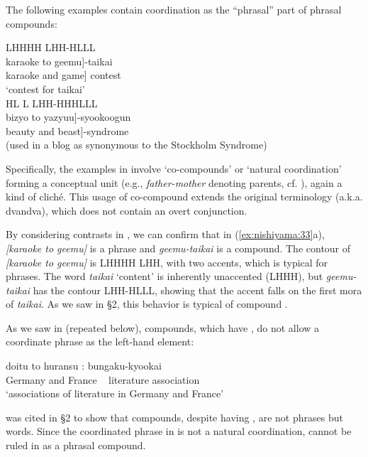 \documentclass[output=paper]{LSP/langsci}
\begin{document}
The following examples contain coordination as the “phrasal” part of phrasal compounds:

\ea\label{ex:nishiyama:33}
 \ea
\glll   LHHHH  LHH-HLLL\\
{\ob}karaoke to geemu]-taikai\\
{\ob}karaoke and game] contest\\  
\glt `contest for taikai' \citep[518]{Kageyama2009}\\
 \ex    
\glll HL L  LHH-HHHLLL\\
{\ob}bizyo to yazyuu]-syookoogun\\
{\ob}beauty and beast]-syndrome\\
\glt (used in a blog as synonymous to the Stockholm Syndrome)\\
\z \z

Specifically, the examples in  involve ‘co-compounds’ or ‘natural coordination’ forming a conceptual unit (e.g., \textit{father-mother} denoting parents, cf. \citealt{Wälchli2005}), again a kind of cliché. This usage of co-compound extends the original terminology (a.k.a. dvandva), which does not contain an overt conjunction.

By considering contrasts in , we can confirm that in (\ref{ex:nishiyama:33}a), \textit{[karaoke to geemu]} is a phrase and \textit{geemu-taikai} is a compound. The contour of \textit{[karaoke to geemu]} is LHHHH  LHH, with two  accents, which is typical for phrases. The word \textit{taikai} ‘content’ is inherently unaccented (LHHH), but \textit{geemu-taikai} has the contour LHH-HLLL, showing that the accent falls on the first mora of \textit{taikai}. As we saw in §2, this behavior is typical of compound .

As we saw in  (repeated below),  compounds, which have , do not allow a coordinate phrase as the left-hand element:

\ea%

   \gll *doitu to huransu    :  bungaku-kyookai\\
    Germany and France   ~ {literature association}\\
\glt    ‘associations of literature in Germany and France’
    \z

         was cited in §2 to show that  compounds, despite having , are not phrases but words. Since the coordinated phrase in  is not a natural coordination,  cannot be ruled in as a phrasal compound.
\end{document}
